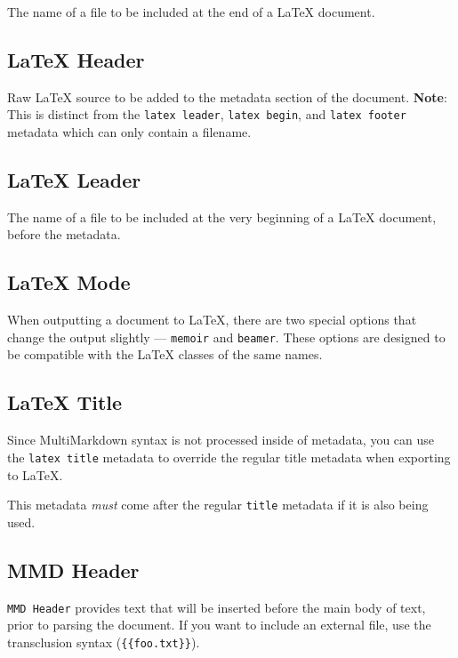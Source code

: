 The name of a file to be included at the end of a LaTeX document.

\subsection{LaTeX Header }
\label{latexheader}

Raw LaTeX source to be added to the metadata section of the document. \textbf{Note}: This is distinct from the \texttt{latex leader}, \texttt{latex begin}, and \texttt{latex footer} metadata which can only contain a filename.

\subsection{LaTeX Leader }
\label{latexleader}

The name of a file to be included at the very beginning of a LaTeX document, before the metadata.

\subsection{LaTeX Mode }
\label{latexmode}

When outputting a document to LaTeX, there are two special options that change
the output slightly --- \texttt{memoir} and \texttt{beamer}. These options are designed to
be compatible with the LaTeX classes of the same names.

\subsection{LaTeX Title }
\label{latextitle}

Since MultiMarkdown syntax is not processed inside of metadata, you can use the \texttt{latex title} metadata to override the regular title metadata when exporting to LaTeX.

This metadata \emph{must} come after the regular \texttt{title} metadata if it is also being used.

\subsection{MMD Header }
\label{mmdheader}

\texttt{MMD Header} provides text that will be inserted before the main body of text, prior to parsing the document. If you want to include an external file, use the transclusion syntax (\texttt{\{\{foo.txt\}\}}).

